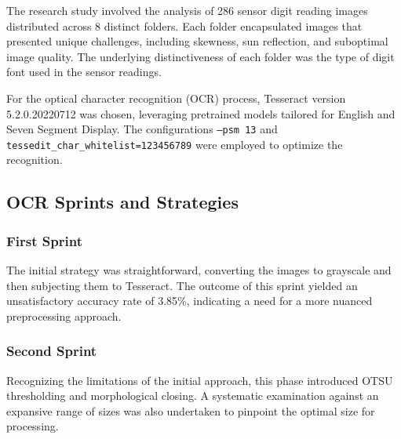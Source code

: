 The research study involved the analysis of 286 sensor digit reading images distributed across 8 distinct folders. Each folder encapsulated images that presented unique challenges, including skewness, sun reflection, and suboptimal image quality. The underlying distinctiveness of each folder was the type of digit font used in the sensor readings.

For the optical character recognition (OCR) process, Tesseract version 5.2.0.20220712 was chosen, leveraging pretrained models tailored for English and Seven Segment Display. The configurations \texttt{--psm 13} and \texttt{tessedit\_char\_whitelist=123456789} were employed to optimize the recognition.

\subsection{OCR Sprints and Strategies}

\subsubsection{First Sprint}
The initial strategy was straightforward, converting the images to grayscale and then subjecting them to Tesseract. The outcome of this sprint yielded an unsatisfactory accuracy rate of 3.85\%, indicating a need for a more nuanced preprocessing approach.

\subsubsection{Second Sprint}
Recognizing the limitations of the initial approach, this phase introduced OTSU thresholding and morphological closing. A systematic examination against an expansive range of sizes was also undertaken to pinpoint the optimal size for processing.

